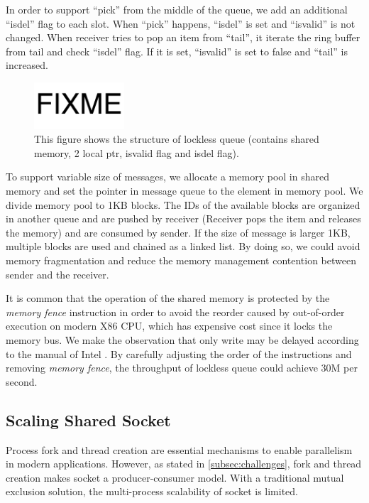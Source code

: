 In order to support ``pick'' from the middle of the queue, we add an additional ``isdel'' flag to each slot. When ``pick'' happens, ``isdel'' is set and ``isvalid'' is not changed. When receiver tries to pop an item from ``tail'', it iterate the ring buffer from tail and check ``isdel'' flag. If it is set, ``isvalid'' is set to false and ``tail'' is increased.
\begin{figure}[t]
	\centering
	\includegraphics[width=0.3\textwidth]{images/fixme}
	\caption{This figure shows the structure of lockless queue (contains shared memory, 2 local ptr, isvalid flag and isdel flag).}
	\label{fig:locklessq-structure}
\end{figure}


To support variable size of messages, we allocate a memory pool in shared memory and set the pointer in message queue to the element in memory pool. We divide memory pool to 1KB blocks. The IDs of the available blocks are organized in another queue and are pushed by receiver (Receiver pops the item and releases the memory) and are consumed by sender. If the size of message is larger 1KB, multiple blocks are used and chained as a linked list. By doing so, we could avoid memory fragmentation and reduce the memory management contention between sender and the receiver. 

It is common that the operation of the shared memory is protected by the \textit{memory fence} instruction in order to avoid the reorder caused by out-of-order execution on modern X86 CPU, which has expensive cost since it locks the memory bus. We make the observation that only write may be delayed according to the manual of Intel \cite{sewell2010x86,intel-manual}. By carefully adjusting the order of the instructions and removing \textit{memory fence}, the throughput of lockless queue could achieve 30M per second. 




\subsection{Scaling Shared Socket}
\label{subsec:fork}

Process fork and thread creation are essential mechanisms to enable parallelism in modern applications. 
However, as stated in \ref{subsec:challenges}, fork and thread creation makes socket a producer-consumer model. With a traditional mutual exclusion solution, the multi-process scalability of socket is limited.

